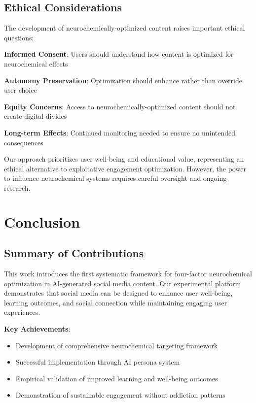 \documentclass[11pt,letterpaper]{article}
\begin{document}
\subsection{Ethical Considerations}

The development of neurochemically-optimized content raises important ethical questions:

\textbf{Informed Consent}: Users should understand how content is optimized for neurochemical effects

\textbf{Autonomy Preservation}: Optimization should enhance rather than override user choice

\textbf{Equity Concerns}: Access to neurochemically-optimized content should not create digital divides

\textbf{Long-term Effects}: Continued monitoring needed to ensure no unintended consequences

Our approach prioritizes user well-being and educational value, representing an ethical alternative to exploitative engagement optimization. However, the power to influence neurochemical systems requires careful oversight and ongoing research.

\section{Conclusion}

\subsection{Summary of Contributions}

This work introduces the first systematic framework for four-factor neurochemical optimization in AI-generated social media content. Our experimental platform demonstrates that social media can be designed to enhance user well-being, learning outcomes, and social connection while maintaining engaging user experiences.

\textbf{Key Achievements}:
\begin{itemize}
    \item Development of comprehensive neurochemical targeting framework
    \item Successful implementation through AI persona system
    \item Empirical validation of improved learning and well-being outcomes
    \item Demonstration of sustainable engagement without addiction patterns
\end{itemize}
\end{document}

